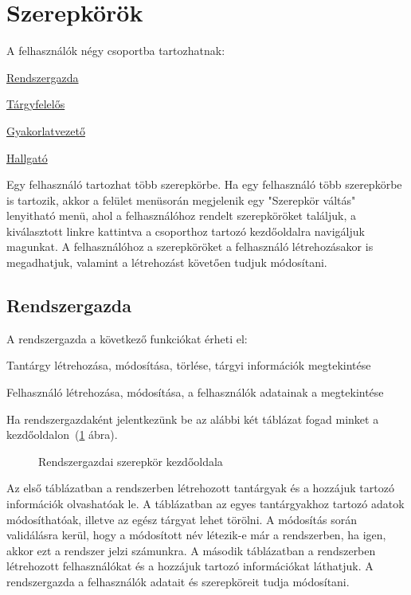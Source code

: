 \section{Szerepkörök}
A felhasználók négy csoportba tartozhatnak:
\begin{compactitem}
    \item \hyperref[step:admin-role]{Rendszergazda}
    \item \hyperref[step:teacher-role]{Tárgyfelelős}
    \item \hyperref[step:instructor-role]{Gyakorlatvezető}
    \item \hyperref[step:student-role]{Hallgató}
\end{compactitem}
Egy felhasználó tartozhat több szerepkörbe. Ha egy felhasználó több szerepkörbe is tartozik, akkor a felület menüsorán megjelenik egy "Szerepkör váltás" lenyitható menü, ahol a felhasználóhoz rendelt szerepköröket találjuk, a kiválasztott linkre kattintva a csoporthoz tartozó kezdőoldalra navigáljuk magunkat. A felhasználóhoz a szerepköröket a felhasználó létrehozásakor is megadhatjuk, valamint a létrehozást követően tudjuk módosítani.
\subsection{Rendszergazda}\label{step:admin-role}
A rendszergazda a következő funkciókat érheti el:
\begin{compactitem}
    \item Tantárgy létrehozása, módosítása, törlése, tárgyi információk megtekintése
    \item Felhasználó létrehozása, módosítása, a felhasználók adatainak a megtekintése
\end{compactitem}
Ha rendszergazdaként jelentkezünk be az alábbi két táblázat fogad minket a kezdőoldalon~(\ref{fig:admin-page} ábra). 
\begin{figure}[H]
	\centering
	\hspace{5pt}
	\caption{Rendszergazdai szerepkör kezdőoldala}
	\label{fig:admin-page}
\end{figure}
Az első táblázatban a rendszerben létrehozott tantárgyak és a hozzájuk tartozó információk olvashatóak le. A táblázatban az egyes tantárgyakhoz tartozó adatok módosíthatóak, illetve az egész tárgyat lehet törölni. A módosítás során validálásra kerül, hogy a módosított név létezik-e már a rendszerben, ha igen, akkor ezt a rendszer jelzi számunkra. A második táblázatban a rendszerben létrehozott felhasználókat és a hozzájuk tartozó információkat láthatjuk. A rendszergazda a felhasználók adatait és szerepköreit tudja módosítani.
